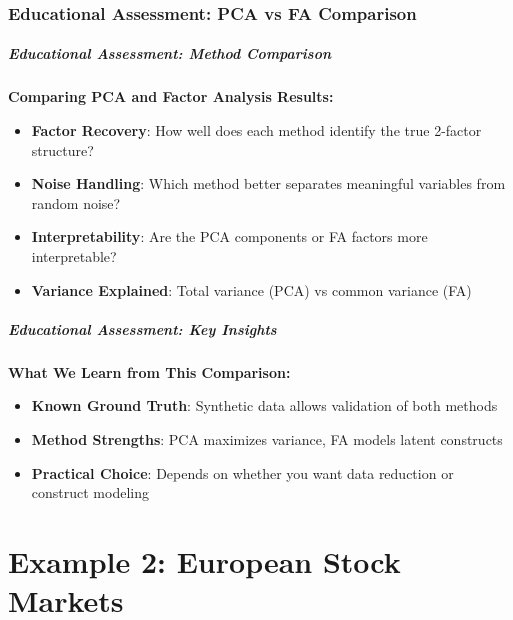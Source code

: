 \documentclass[aspectratio=169]{beamer}
\begin{document}
\section{Educational Assessment: PCA vs FA Comparison}

\begin{frame}
    \frametitle{Educational Assessment: Method Comparison}
    \textbf{Comparing PCA and Factor Analysis Results:}
    \begin{itemize}
        \item \textbf{Factor Recovery}: How well does each method identify the true 2-factor structure? \pause
        \item \textbf{Noise Handling}: Which method better separates meaningful variables from random noise? \pause
        \item \textbf{Interpretability}: Are the PCA components or FA factors more interpretable? \pause
        \item \textbf{Variance Explained}: Total variance (PCA) vs common variance (FA) \pause
    \end{itemize}
\end{frame}

\begin{frame}
    \frametitle{Educational Assessment: Key Insights}
    \textbf{What We Learn from This Comparison:}
    \begin{itemize}
        \item \textbf{Known Ground Truth}: Synthetic data allows validation of both methods \pause
        \item \textbf{Method Strengths}: PCA maximizes variance, FA models latent constructs \pause
        \item \textbf{Practical Choice}: Depends on whether you want data reduction or construct modeling \pause
    \end{itemize}
\end{frame}


\part{Example 2: European Stock Markets}

\begin{frame}
    \partpage
\end{frame}
\end{document}
